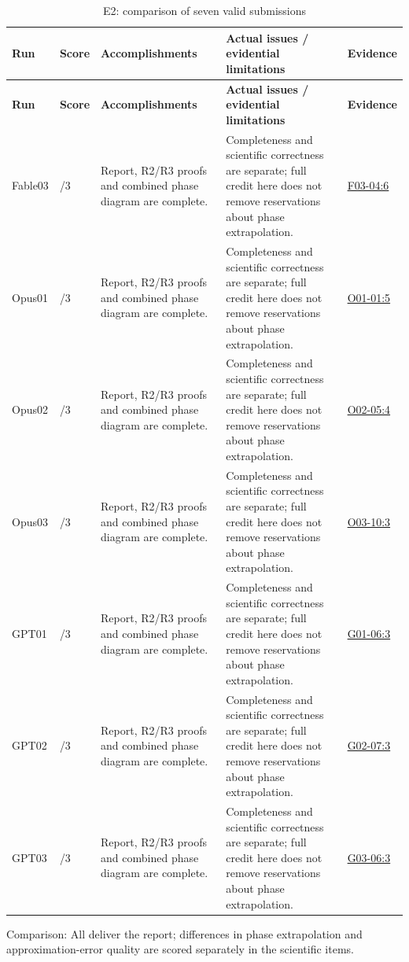 \documentclass[11pt,a4paper]{article}
\begin{document}
{\fontsize{9.0}{12.6}\selectfont
\setlength{\tabcolsep}{2.5pt}
\begin{longtable}{>{\raggedright\arraybackslash}p{}>{\raggedright\arraybackslash}p{}>{\raggedright\arraybackslash}p{}>{\raggedright\arraybackslash}p{}>{\raggedright\arraybackslash}p{}}
\caption{E2: comparison of seven valid submissions}\\
\toprule
\textbf{Run} & \textbf{Score} & \textbf{Accomplishments} & \textbf{Actual issues /\allowbreak{} evidential limitations} & \textbf{Evidence}\tabularnewline
\midrule
\endfirsthead
\toprule
\textbf{Run} & \textbf{Score} & \textbf{Accomplishments} & \textbf{Actual issues /\allowbreak{} evidential limitations} & \textbf{Evidence}\tabularnewline
\midrule
\endhead
{}Fable03 & 3/\allowbreak{}3 & Report,\allowbreak{} R2/\allowbreak{}R3 proofs and combined phase diagram are complete. & Completeness and scientific correctness are separate; full credit here does not remove reservations about phase extrapolation. & \hyperref[src:F03-04]{F03-04:6}\tabularnewline
{}Opus01 & 3/\allowbreak{}3 & Report,\allowbreak{} R2/\allowbreak{}R3 proofs and combined phase diagram are complete. & Completeness and scientific correctness are separate; full credit here does not remove reservations about phase extrapolation. & \hyperref[src:O01-01]{O01-01:5}\tabularnewline
{}Opus02 & 3/\allowbreak{}3 & Report,\allowbreak{} R2/\allowbreak{}R3 proofs and combined phase diagram are complete. & Completeness and scientific correctness are separate; full credit here does not remove reservations about phase extrapolation. & \hyperref[src:O02-05]{O02-05:4}\tabularnewline
{}Opus03 & 3/\allowbreak{}3 & Report,\allowbreak{} R2/\allowbreak{}R3 proofs and combined phase diagram are complete. & Completeness and scientific correctness are separate; full credit here does not remove reservations about phase extrapolation. & \hyperref[src:O03-10]{O03-10:3}\tabularnewline
{}GPT01 & 3/\allowbreak{}3 & Report,\allowbreak{} R2/\allowbreak{}R3 proofs and combined phase diagram are complete. & Completeness and scientific correctness are separate; full credit here does not remove reservations about phase extrapolation. & \hyperref[src:G01-06]{G01-06:3}\tabularnewline
{}GPT02 & 3/\allowbreak{}3 & Report,\allowbreak{} R2/\allowbreak{}R3 proofs and combined phase diagram are complete. & Completeness and scientific correctness are separate; full credit here does not remove reservations about phase extrapolation. & \hyperref[src:G02-07]{G02-07:3}\tabularnewline
{}GPT03 & 3/\allowbreak{}3 & Report,\allowbreak{} R2/\allowbreak{}R3 proofs and combined phase diagram are complete. & Completeness and scientific correctness are separate; full credit here does not remove reservations about phase extrapolation. & \hyperref[src:G03-06]{G03-06:3}\tabularnewline
\bottomrule
\end{longtable}
}
Comparison: All deliver the report; differences in phase extrapolation and approximation-error quality are scored separately in the scientific items.
\end{document}
